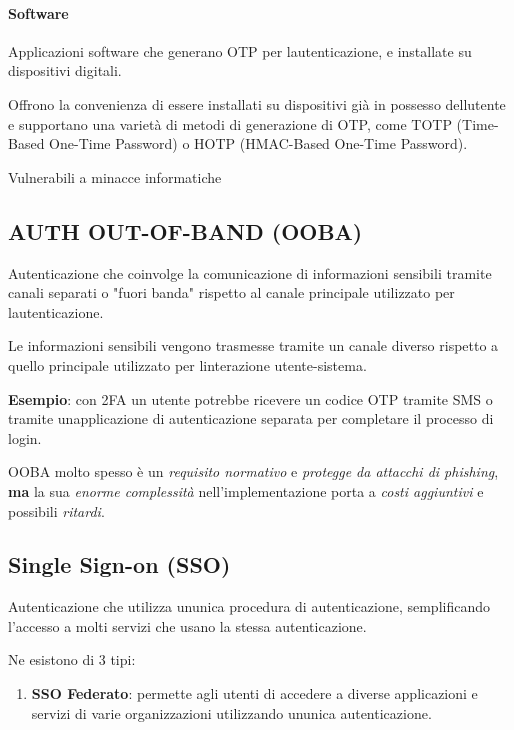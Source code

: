 \paragraph{Software}\label{software}

Applicazioni software che generano OTP per
l\textquotesingle autenticazione, e installate su dispositivi digitali.

Offrono la convenienza di essere installati su dispositivi già in
possesso dell\textquotesingle utente e supportano una varietà di metodi
di generazione di OTP, come TOTP (Time-Based One-Time Password) o HOTP
(HMAC-Based One-Time Password).

Vulnerabili a minacce informatiche

\subsection{AUTH OUT-OF-BAND (OOBA)}\label{auth-out-of-band-ooba}

Autenticazione che coinvolge la comunicazione di informazioni sensibili
tramite canali separati o "fuori banda" rispetto al canale principale
utilizzato per l\textquotesingle autenticazione.

Le informazioni sensibili vengono trasmesse tramite un canale diverso
rispetto a quello principale utilizzato per
l\textquotesingle interazione utente-sistema.

\textbf{Esempio}: con 2FA un utente potrebbe ricevere un codice OTP
tramite SMS o tramite un\textquotesingle applicazione di autenticazione
separata per completare il processo di login.

OOBA molto spesso è un \emph{requisito normativo} e \emph{protegge da
attacchi di phishing}, \textbf{ma} la sua \emph{enorme complessità}
nell'implementazione porta a \emph{costi aggiuntivi} e possibili
\emph{ritardi}.

\subsection{Single Sign-on (SSO)}\label{single-sign-on-sso}

Autenticazione che utilizza un\textquotesingle unica procedura di
autenticazione, semplificando l'accesso a molti servizi che usano la
stessa autenticazione.

Ne esistono di 3 tipi:

\begin{enumerate}
\def\labelenumi{\arabic{enumi}.}
\item
  \textbf{SSO Federato}: permette agli utenti di accedere a diverse
  applicazioni e servizi di varie organizzazioni utilizzando
  un\textquotesingle unica autenticazione.
\end{enumerate}

